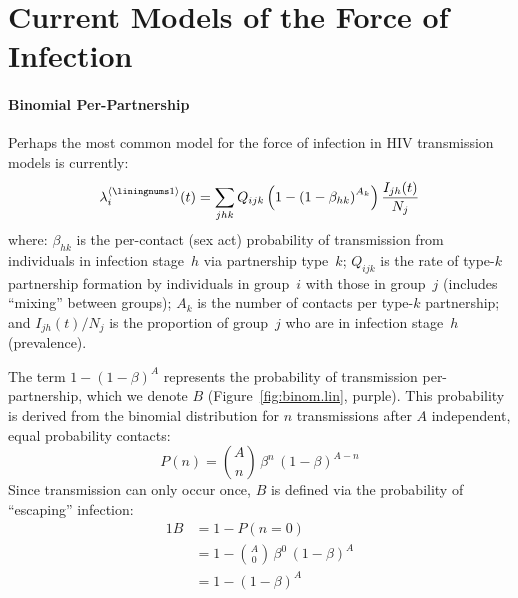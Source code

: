 \section{Current Models of the Force of Infection}
\paragraph{ Binomial Per-Partnership}
Perhaps the most common model for the force of infection in HIV transmission models is currently:
\begin{equation}\label{eq:foi.1}
  \lambda_i^{\case{1}}(t) =
  \sum_{jhk} Q_{ijk} \left(1 - {\left(1 - \beta_{hk}\right)}^{A_k}\right) \frac{I_{jh}(t)}{N_j}
\end{equation}
where:
$\beta_{hk}$ is the per-contact (sex act) probability of transmission
from individuals in infection stage~$h$ via partnership type~$k$;
$Q_{ijk}$ is the rate of type-$k$ partnership formation
by individuals in group~$i$ with those in group~$j$
(includes ``mixing'' between groups);
$A_k$ is the number of contacts per type-$k$ partnership; and
$I_{jh}(t) / N_j$ is the proportion of group~$j$ who are in infection stage~$h$ (prevalence).
\par
The term $1 - (1 - \beta)^A$ represents
the probability of transmission per-partnership, which we denote $B$
(Figure~\ref{fig:binom.lin}, purple).
This probability is derived from the binomial distribution
for $n$ transmissions after $A$ independent, equal probability contacts:
\begin{equation}
  P(n) = {A \choose n}\,\beta^n\,{(1 - \beta)}^{A-n}
\end{equation}
Since transmission can only occur once, $B$ is defined via the probability of ``escaping'' infection:
\begin{alignat}{1}\label{eq:B}
  B &= 1 - P(n = 0) \nonumber\\
  &= 1 - {A \choose 0}\,\beta^0\,{(1 - \beta)}^{A} \nonumber\\
  &= 1 - {(1 - \beta)}^A
\end{alignat}
